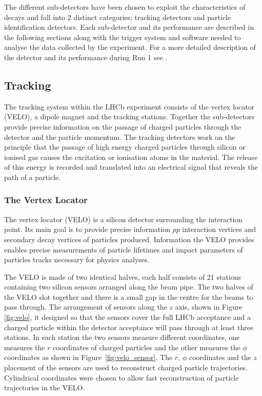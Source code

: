 The different sub-detectors have been chosen to exploit the characteristics of \bhadron decays and fall into 2 distinct categories; tracking detectors and particle identification detectors. Each sub-detector and its performance are described in the following sections along with the trigger system and software needed to analyse the data collected by the experiment. %
For a more detailed description of the detector and its performance during Run 1 see \cite{LHCb:2003ab,Aaij:2014jba}.




\subsection{Tracking}
\label{Tracking}

The tracking system within the LHCb experiment consists of the vertex locator (VELO), a dipole magnet and the tracking stations. Together the sub-detectors provide precise information on the passage of charged particles through the detector and the particle momentum. 
The tracking detectors work on the principle that the passage of high energy charged particles through silicon or ionised gas causes the excitation or ionisation atoms in the material. The release of this energy is recorded and translated into an electrical signal that reveals the path of a particle. 

\subsubsection{The Vertex Locator}
\label{VELO}
The vertex locator (VELO) is a silicon detector surrounding the interaction point. Its main goal is to provide precise information $pp$ interaction vertices and secondary decay vertices of particles produced. Information the VELO provides enables precise measurements of particle lifetimes and impact parameters of particles tracks necessary for physics analyses.


The VELO is made of two identical halves, each half consists of 21 stations containing two silicon sensors arranged along the beam pipe. The two halves of the VELO slot together and there is a small gap in the centre for the beams to pass through. The arrangement of sensors along the $z$ axis, shown in Figure \ref{fig:velo}, it designed so that the sensors cover the full LHCb acceptance and a charged particle within the detector acceptance will pass through at least three stations. In each station the two sensors measure different coordinates, one measures the $r$ coordinates of charged particles and the other measures the $\phi$ coordinates as shown in Figure~\ref{fig:velo_sensor}. The $r$, $\phi$ coordinates and the $z$ placement of the sensors are used to reconstruct charged particle trajectories. Cylindrical coordinates were chosen to allow fast reconstruction of particle trajectories in the VELO.

